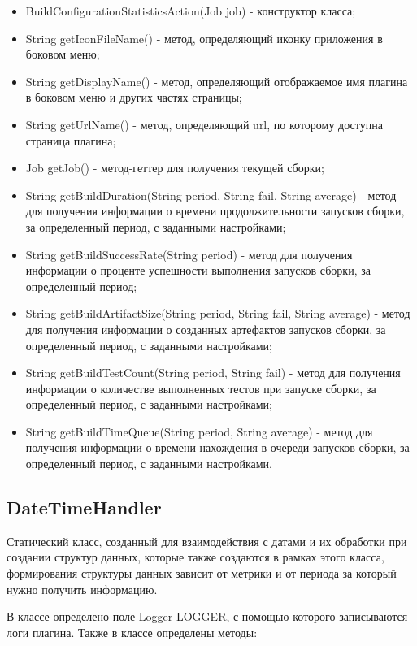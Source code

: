 \begin{itemize}
	\item BuildConfigurationStatisticsAction(Job job) - конструктор класса;
	\item String getIconFileName() - метод, определяющий иконку приложения в боковом меню;
	\item String getDisplayName() - метод, определяющий отображаемое имя плагина в боковом меню и других частях страницы;
	\item String getUrlName() - метод, определяющий url, по которому доступна страница плагина;
	\item Job getJob() - метод-геттер для получения текущей сборки;
	\item String getBuildDuration(String period, String fail, String average) - метод для получения информации о времени продолжительности запусков сборки, за определенный период, с заданными настройками;
	\item String getBuildSuccessRate(String period) - метод для получения информации о проценте успешности выполнения запусков сборки, за определенный период;
	\item String getBuildArtifactSize(String period, String fail, String average) - метод для получения информации о созданных артефактов запусков сборки, за определенный период, с заданными настройками;
	\item String getBuildTestCount(String period, String fail) - метод для получения информации о количестве выполненных тестов при запуске сборки, за определенный период, с заданными настройками;
	\item String getBuildTimeQueue(String period, String average) - метод для получения информации о времени нахождения в очереди запусков сборки, за определенный период, с заданными настройками.
\end{itemize}

\subsection{DateTimeHandler}

Статический класс, созданный для взаимодействия с датами и их обработки при создании структур данных, которые также создаются в рамках этого класса, формирования структуры данных зависит от метрики и от периода за который нужно получить информацию.

В классе определено поле Logger LOGGER, с помощью которого записываются логи плагина. Также в классе определены методы:

